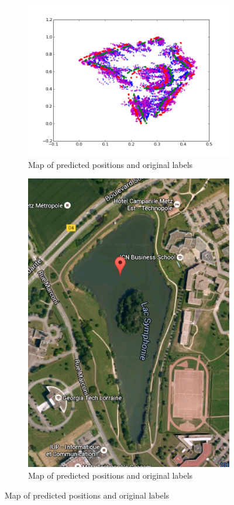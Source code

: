 \begin{figure}[!h]
\centering
\begin{subfigure}{0.5\textwidth}
\centering
\label{map}
\includegraphics[width=0.7\linewidth]{images/regression/lake_prediction.png}
\caption{Map of predicted positions and original labels}
\end{subfigure}%
\begin{subfigure}{0.5\textwidth}
\centering
\label{lake}
\includegraphics[width=0.7\linewidth]{images/regression/lake.png}
\caption{Map of predicted positions and original labels}
\end{subfigure}
\end{figure}
